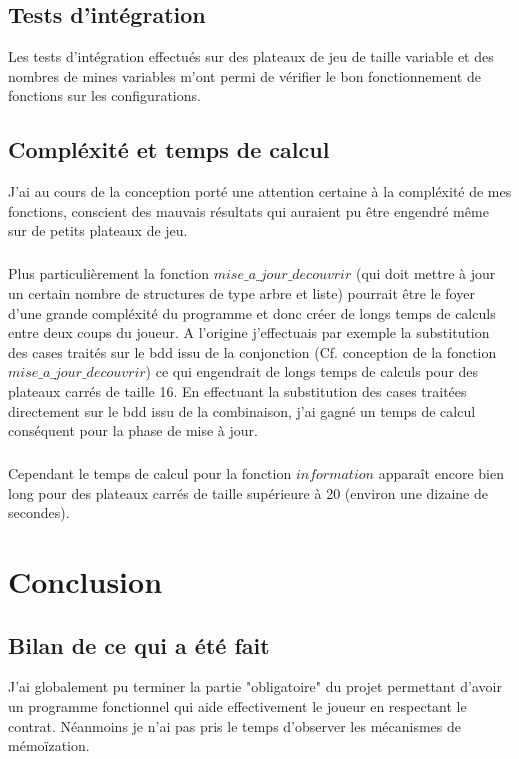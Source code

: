 \documentclass{report}
\begin{document}
\section{Tests d'intégration}
	Les tests d'intégration effectués sur des plateaux de jeu de taille variable et des nombres de mines variables m'ont permi de vérifier le bon fonctionnement de fonctions sur les configurations.

\section{Compléxité et temps de calcul}
	J'ai au cours de la conception porté une attention certaine à la compléxité de mes fonctions, conscient des mauvais résultats qui auraient pu \^etre engendré m\^eme sur de petits plateaux de jeu.
	\paragraph{}
	Plus particulièrement la fonction $mise\_a\_jour\_decouvrir$ (qui doit mettre à jour un certain nombre de structures de type arbre et liste) pourrait \^etre le foyer d'une grande compléxité du programme et donc créer de longs temps de calculs entre deux coups du joueur.
	A l'origine j'effectuais par exemple la substitution des cases traités sur le bdd issu de la conjonction (Cf. conception de la fonction $mise\_a\_jour\_decouvrir$) ce qui engendrait de longs temps de calculs pour des plateaux carrés de taille 16. En effectuant la substitution des cases traitées directement sur le bdd issu de la combinaison, j'ai gagné un temps de calcul conséquent pour la phase de mise à jour.
	\paragraph{}
	Cependant le temps de calcul pour la fonction $information$ appara\^it encore bien long pour des plateaux carrés de taille supérieure à 20 (environ une dizaine de secondes).

\chapter{Conclusion}
	\section{Bilan de ce qui a été fait}
	J'ai globalement pu terminer la partie "obligatoire" du projet permettant d'avoir un programme fonctionnel qui aide effectivement le joueur en respectant le contrat. Néanmoins je n'ai pas pris le temps d'observer les mécanismes de mémo\"ization.
\end{document}
